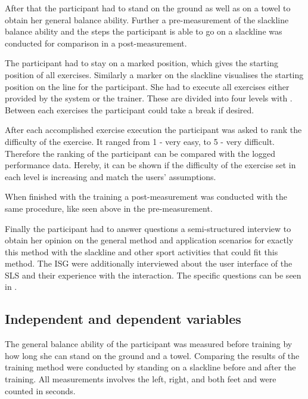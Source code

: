 
After that the participant had to stand on the ground as well as on a towel to obtain her general balance ability.
Further a pre-measurement of the slackline balance ability and the steps the participant is able to go on a slackline was conducted for comparison in a post-measurement.

The participant had to stay on a marked position, which gives the starting position of all exercises. Similarly a marker on the slackline visualises the starting position on the line for the participant. She had to execute all exercises either provided by the system or the trainer. These are divided into four levels with . Between each exercises the participant could take a break if desired.

After each accomplished exercise execution the participant was asked to rank the difficulty of the exercise. It ranged from 1 - very easy, to 5 - very difficult. Therefore the ranking of the participant can be compared with the logged performance data. Hereby, it can be shown if the difficulty of the exercise set in each level is increasing and match the users' assumptions. %



When finished with the training a post-measurement was conducted with the same procedure, like seen above in the pre-measurement.

Finally the participant had to answer questions a semi-structured interview to obtain her opinion on the general method and application scenarios for exactly this method with the slackline and other sport activities that could fit this method. The ISG were additionally interviewed about the user interface of the SLS and their experience with the interaction. The specific questions can be seen in .

\subsection{Independent and dependent variables}\label{6_variables}
The general balance ability of the participant was measured before training by how long she can stand on the ground and a towel. Comparing the results of the training method were conducted by standing on a slackline before and after the training. All measurements involves the left, right, and both feet and were counted in seconds. 

